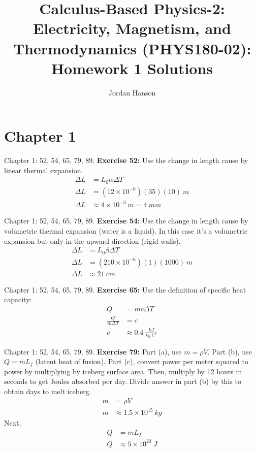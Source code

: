\documentclass{beamer}
\title{Calculus-Based Physics-2: Electricity, Magnetism, and Thermodynamics (PHYS180-02): Homework 1 Solutions}
\author{Jordan Hanson}
\institute{Whittier College Department of Physics and Astronomy}
\begin{document}
\maketitle

\section{Chapter 1}

\begin{frame}{Chapter 1: 52, 54, 65, 79, 89.}
\textbf{Exercise 52:} Use the change in length cause by linear thermal expansion.
\begin{align}
\Delta L &= L_0 \alpha \Delta T \\
\Delta L &= (12\times 10^{-6})(35)(10)~m \\
\Delta L &\approx 4 \times 10^{-3}~m = 4~mm
\end{align}
\end{frame}

\begin{frame}{Chapter 1: 52, 54, 65, 79, 89.}
\textbf{Exercise 54:} Use the change in length cause by volumetric thermal expansion (water is a liquid). In this case it's a volumetric expansion but only in the upward direction (rigid walls).
\begin{align}
\Delta L &= L_0 \beta \Delta T \\
\Delta L &= (210\times 10^{-6})(1)(1000)~m \\
\Delta L &\approx 21 ~ cm
\end{align}
\end{frame}

\begin{frame}{Chapter 1: 52, 54, 65, 79, 89.}
\textbf{Exercise 65:} Use the definition of specific heat capacity:
\begin{align}
Q &= mc \Delta T \\
\frac{Q}{m\Delta T} &= c \\
c &\approx 0.4 ~ \frac{kJ}{kg~C^{\circ}}
\end{align}
\end{frame}

\begin{frame}{Chapter 1: 52, 54, 65, 79, 89.}
\small
\textbf{Exercise 79:} Part (a), use $m=\rho V$.  Part (b), use $Q = mL_f$ (latent heat of fusion).  Part (c), convert power per meter squared to power by multiplying by iceberg surface area.  Then, multiply by 12 hours in seconds to get Joules absorbed per day.  Divide answer in part (b) by this to obtain days to melt iceberg.
\begin{align}
m &= \rho V \\
m &\approx 1.5\times 10^{15}~kg
\end{align}
Next,
\begin{align}
Q &= m L_f \\
Q &\approx 5\times 10^{20}~J
\end{align}
\end{frame}
\end{document}
